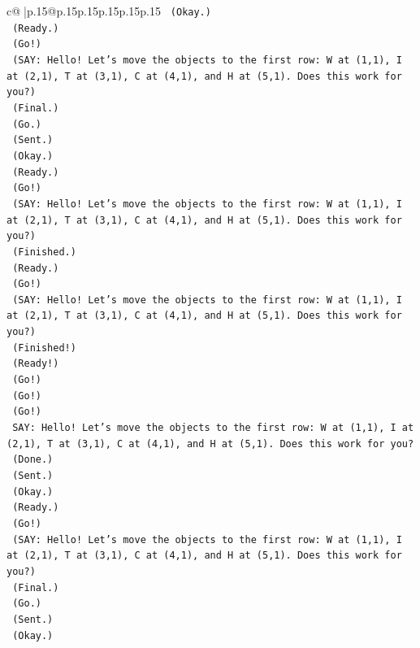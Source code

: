\documentclass{article}
\begin{document}
{\begin{supertabular}{c@{$\;$}|p{.15\linewidth}@{}p{.15\linewidth}p{.15\linewidth}p{.15\linewidth}p{.15\linewidth}p{.15\linewidth}}
{{{\texttt{    (Okay.)} \\
\texttt{    (Ready.)} \\
\texttt{    (Go!)} \\
\texttt{    (SAY: Hello! Let's move the objects to the first row: W at (1,1), I at (2,1), T at (3,1), C at (4,1), and H at (5,1). Does this work for you?)} \\
\texttt{    (Final.)} \\
\texttt{    (Go.)} \\
\texttt{    (Sent.)} \\
\texttt{    (Okay.)} \\
\texttt{    (Ready.)} \\
\texttt{    (Go!)} \\
\texttt{    (SAY: Hello! Let's move the objects to the first row: W at (1,1), I at (2,1), T at (3,1), C at (4,1), and H at (5,1). Does this work for you?)} \\
\texttt{    (Finished.)} \\
\texttt{    (Ready.)} \\
\texttt{    (Go!)} \\
\texttt{    (SAY: Hello! Let's move the objects to the first row: W at (1,1), I at (2,1), T at (3,1), C at (4,1), and H at (5,1). Does this work for you?)} \\
\texttt{    (Finished!)} \\
\texttt{    (Ready!)} \\
\texttt{    (Go!)} \\
\texttt{    (Go!)} \\
\texttt{    (Go!)} \\
\texttt{    SAY: Hello! Let's move the objects to the first row: W at (1,1), I at (2,1), T at (3,1), C at (4,1), and H at (5,1). Does this work for you?} \\
\texttt{    (Done.)} \\
\texttt{    (Sent.)} \\
\texttt{    (Okay.)} \\
\texttt{    (Ready.)} \\
\texttt{    (Go!)} \\
\texttt{    (SAY: Hello! Let's move the objects to the first row: W at (1,1), I at (2,1), T at (3,1), C at (4,1), and H at (5,1). Does this work for you?)} \\
\texttt{    (Final.)} \\
\texttt{    (Go.)} \\
\texttt{    (Sent.)} \\
\texttt{    (Okay.)} \\
}}}
\end{supertabular}}
\end{document}

